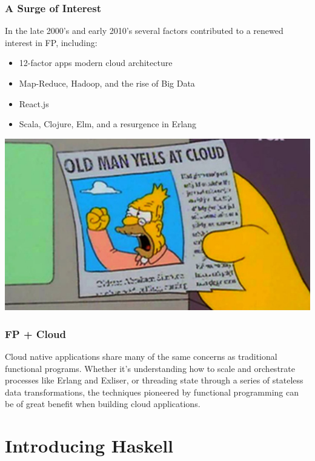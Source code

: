 \documentclass{beamer}
\begin{document}
\begin{frame}
  \frametitle{A Surge of Interest}
  In the late 2000's and early 2010's several factors contributed to a
  renewed interest in FP, including:
  \begin{itemize}
  \item 12-factor apps modern cloud architecture
  \item Map-Reduce, Hadoop, and the rise of Big Data
  \item React.js
  \item Scala, Clojure, Elm, and a resurgence in Erlang
  \end{itemize}
\end{frame}

\begin{frame}
  \begin{center}
    \includegraphics[width=.90\paperwidth]{images/cloud.jpg}
  \end{center}
\end{frame}

\begin{frame}
  \frametitle{FP + Cloud}
  Cloud native applications share many of the same concerns as
  traditional functional programs.  Whether it's understanding how to
  scale and orchestrate processes like Erlang and Exliser, or
  threading state through a series of stateless data transformations,
  the techniques pioneered by functional programming can be of great
  benefit when building cloud applications.
\end{frame}

\section{Introducing Haskell}
\end{document}

